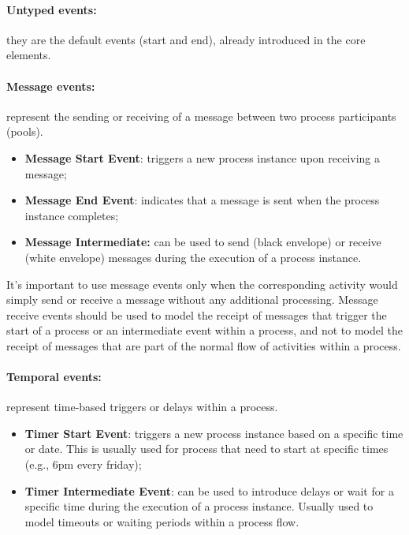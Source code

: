 \paragraph{Untyped events:} they are the default events (start and end), already introduced in the core elements.
\paragraph{Message events:} represent the sending or receiving of a message between two process participants (pools).
\begin{itemize}
    \item \textbf{Message Start Event}: triggers a new process instance upon receiving a message;
    \item \textbf{Message End Event}: indicates that a message is sent when the process instance completes;
    \item \textbf{Message Intermediate:} can be used to send (black envelope) or receive (white envelope) messages during the execution of a process instance.
\end{itemize}
It's important to use message events only when the corresponding activity would simply send or receive a message without any additional processing.
Message receive events should be used to model the receipt of messages that trigger the start of a process or an intermediate event within a process, and not to model the receipt of messages that are part of the normal flow of activities within a process.
\paragraph{Temporal events:} represent time-based triggers or delays within a process.
\begin{itemize}
    \item \textbf{Timer Start Event}: triggers a new process instance based on a specific time or date. This is usually used for process that need to start at specific times (e.g., 6pm every friday);
    \item \textbf{Timer Intermediate Event}: can be used to introduce delays or wait for a specific time during the execution of a process instance.
    Usually used to model timeouts or waiting periods within a process flow.
\end{itemize}

